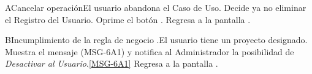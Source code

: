 		\begin{UCtrayectoriaA}{A}{Cancelar operación}{El usuario abandona el Caso de Uso.}
			\UCpaso[\UCactor] Decide ya no eliminar el Registro del Usuario.
			\UCpaso[\UCactor] Oprime el botón .
			\UCpaso Regresa a la pantalla .
		\end{UCtrayectoriaA}

		\begin{UCtrayectoriaA}{B}{Incumplimiento de la regla de negocio .}{El usuario tiene un proyecto designado.}	
			\UCpaso Muestra el mensaje (MSG-6A1) y notifica al Administrador la posibilidad de \textit{Desactivar al Usuario}.\ref{MSG-6A1}
			\UCpaso Regresa a la pantalla .
		\end{UCtrayectoriaA}

